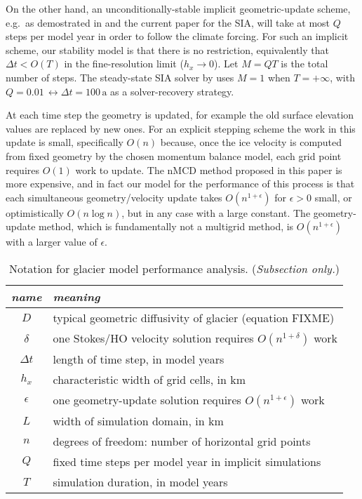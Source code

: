 \documentclass[twocolumn,letterpaper]{igs}
\newcommand\eps{\epsilon}
\begin{document}
On the other hand, an unconditionally-stable implicit geometric-update scheme, e.g.~as demostrated in \citep{Bueler2016} and the current paper for the SIA, will take at most $Q$ steps per model year in order to follow the climate forcing.  For such an implicit scheme, our stability model is that there is no restriction, equivalently that $\Delta t < O(T)$ in the fine-resolution limit ($h_x \to 0$).  Let $M=QT$ is the total number of steps.  The steady-state SIA solver by \cite{Bueler2016} uses $M=1$ when $T=+\infty$, with $Q=0.01 \, \leftrightarrow \Delta t = 100 \,\text{a}$ as a solver-recovery strategy.

At each time step the geometry is updated, for example the old surface elevation values are replaced by new ones.  For an explicit stepping scheme the work in this update is small, specifically $O(n)$ because, once the ice velocity is computed from fixed geometry by the chosen momentum balance model, each grid point requires $O(1)$ work to update.  The nMCD method proposed in this paper is more expensive, and in fact our model for the performance of this process is that each simultaneous geometry/velocity update takes $O(n^{1+\eps})$ for $\eps > 0$ small, or optimistically $O(n \log n)$, but in any case with a large constant.  The \cite{Bueler2016} geometry-update method, which is fundamentally not a multigrid method, is $O(n^{1+\eps})$ with a larger value of $\eps$.

\begin{table*}
\begin{center}
\begin{tabular}{cl}
\emph{name} & \emph{meaning} \\ \hline
$D$ & typical geometric diffusivity of glacier (equation FIXME) \\
$\delta$ & one Stokes/HO velocity solution requires $O(n^{1+\delta})$ work\\
$\Delta t$ & length of time step, in model years \\
$h_x$ & characteristic width of grid cells, in km \\
$\eps$ & one geometry-update solution requires $O(n^{1+\eps})$ work \\
$L$ & width of simulation domain, in km \\
$n$ & degrees of freedom: number of horizontal grid points \\
$Q$ & fixed time steps per model year in implicit simulations \\
$T$ & simulation duration, in model years \\
\end{tabular}
\end{center}

\medskip
\caption{Notation for glacier model performance analysis.  (\emph{Subsection only.})}
\label{tab:performanceconstants}
\end{table*}
\end{document}
